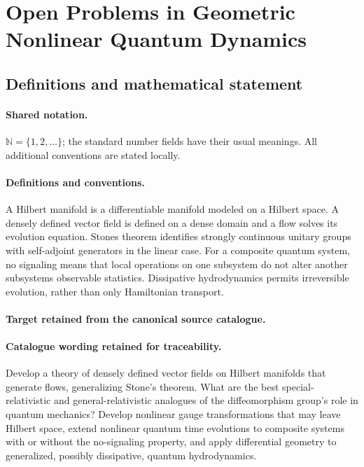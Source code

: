 \documentclass[11pt]{article}
\begin{document}
\section{Open Problems in Geometric Nonlinear Quantum Dynamics}\label{statement}

\subsection{Definitions and mathematical statement}

\paragraph{Shared notation.}$\mathbb N=\{1,2,\ldots\}$; the standard number fields have their usual meanings. All additional conventions are stated locally.


\paragraph{Definitions and conventions.}
A Hilbert manifold is a differentiable manifold modeled on a Hilbert space. A densely defined vector field is defined on a dense domain and a flow solves its evolution equation. Stone\textquotesingle s theorem identifies strongly continuous unitary groups with self-adjoint generators in the linear case. For a composite quantum system, no signaling means that local operations on one subsystem do not alter another subsystem\textquotesingle s observable statistics. Dissipative hydrodynamics permits irreversible evolution, rather than only Hamiltonian transport.

\paragraph{Target retained from the canonical source catalogue.}
\paragraph{Catalogue wording retained for traceability.}
Develop a theory of densely defined vector fields on Hilbert manifolds that generate flows, generalizing Stone’s theorem. What are the best special-relativistic and general-relativistic analogues of the diffeomorphism group’s role in quantum mechanics? Develop nonlinear gauge transformations that may leave Hilbert space, extend nonlinear quantum time evolutions to composite systems with or without the no-signaling property, and apply differential geometry to generalized, possibly dissipative, quantum hydrodynamics.
\end{document}

